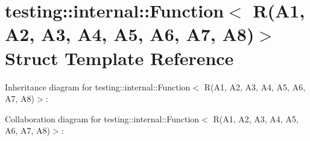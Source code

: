 \hypertarget{structtesting_1_1internal_1_1Function_3_01R_07A1_00_01A2_00_01A3_00_01A4_00_01A5_00_01A6_00_01A7_00_01A8_08_4}{}\section{testing\+:\+:internal\+:\+:Function$<$ R(A1, A2, A3, A4, A5, A6, A7, A8)$>$ Struct Template Reference}
\label{structtesting_1_1internal_1_1Function_3_01R_07A1_00_01A2_00_01A3_00_01A4_00_01A5_00_01A6_00_01A7_00_01A8_08_4}


Inheritance diagram for testing\+:\+:internal\+:\+:Function$<$ R(A1, A2, A3, A4, A5, A6, A7, A8)$>$\+:


Collaboration diagram for testing\+:\+:internal\+:\+:Function$<$ R(A1, A2, A3, A4, A5, A6, A7, A8)$>$\+:
